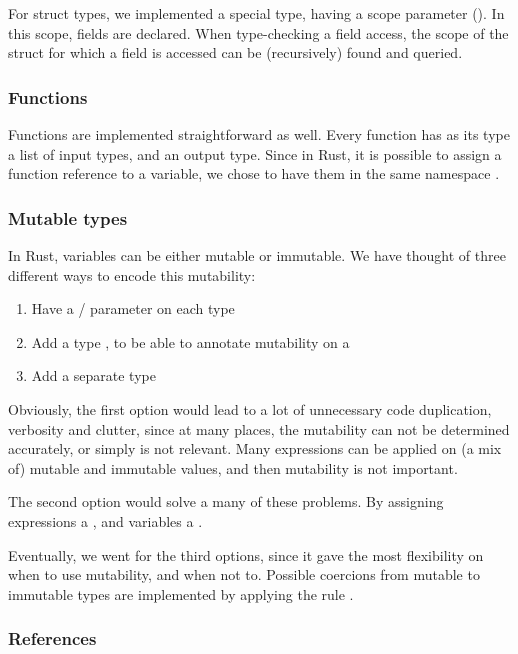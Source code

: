 For struct types, we implemented a special type, having a scope parameter (). In this scope, fields are declared. When type-checking a field access, the scope of the struct for which a field is accessed can be (recursively) found and queried.

\subsubsection{Functions}

Functions are implemented straightforward as well. Every function has as its type a list of input types, and an output type. Since in Rust, it is possible to assign a function reference to a variable, we chose to have them in the same namespace .

\subsubsection{Mutable types}

In Rust, variables can be either mutable or immutable. We have thought of three different ways to encode this mutability:
\begin{enumerate}
    \item Have a / parameter on each type
    \item Add a type , to be able to annotate mutability on a 
    \item Add a separate type 
\end{enumerate}

Obviously, the first option would lead to a lot of unnecessary code duplication, verbosity and clutter, since at many places, the mutability can not be determined accurately, or simply is not relevant. Many expressions can be applied on (a mix of) mutable and immutable values, and then mutability is not important.

The second option would solve a many of these problems. By assigning expressions a , and variables a . 

Eventually, we went for the third options, since it gave the most flexibility on when to use mutability, and when not to. Possible coercions from mutable to immutable types are implemented by applying the rule .

\subsubsection{References}

